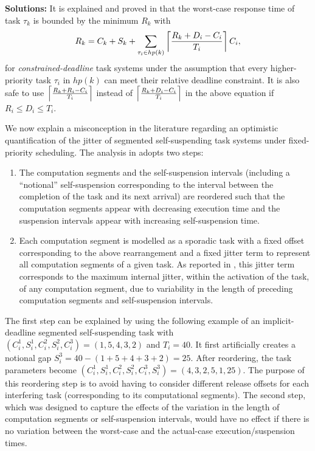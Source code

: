{\bf Solutions:} It is explained and proved in \cite{huangpass:dac2015,BletsasReport2015} that the worst-case response time of task $\tau_k$ is bounded by the minimum $R_k$ with
\begin{equation}
R_k = C_k+ S_k+\sum_{\tau_i \in hp(k)}\left\lceil{\frac{R_k+D_i-C_i}{T_i}}\right\rceil C_i,
\label{eq:dynamic-correct}
\end{equation}
for \emph{constrained-deadline} task systems under the assumption that every higher-priority task $\tau_i$ in $hp(k)$ can meet their relative deadline constraint. It is also safe to use $\left\lceil{\frac{R_k+R_i-C_i}{T_i}}\right\rceil$ instead of $\left\lceil{\frac{R_k+D_i-C_i}{T_i}}\right\rceil$ in the above equation if $R_i \leq D_i \leq T_i$.

\label{sec:wrong-jitter-segmented}


We now explain a misconception in the literature regarding an optimistic quantification of the jitter of segmented self-suspending task systems under fixed-priority scheduling.  The analysis in \cite{RTCSA-BletsasA05} adopts two steps: 
\begin{enumerate}
\item The computation segments and the self-suspension intervals (including a ``notional''
self-suspension corresponding to the interval between the completion of the task and its next arrival)
are reordered such that the computation segments appear with decreasing execution time and
the suspension intervals appear with increasing self-suspension time.
\item Each computation segment is modelled as a sporadic task with a fixed offset corresponding to the above
rearrangement and a fixed jitter term to represent all computation segments of a given task.
As reported in \cite{RTCSA-BletsasA05}, this jitter term corresponds to the maximum internal jitter, within the 
activation of the task, of any computation segment, due to variability in the length of 
preceding computation segments and self-suspension intervals.
\end{enumerate}
The first step can be explained by using the following example of an
implicit-deadline segmented self-suspending task with $(C_i^1, S_i^1, C_i^2, S_i^2, C_i^3) = (1, 5, 4, 3, 2)$ and $T_i=40$.  It first artificially creates a notional gap $S_i^3=40-(1+5+4+3+2)=25$. After reordering, the task parameters become $(C_i^1, S_i^1, C_i^2, S_i^2, C_i^3, S_i^3)  = (4, 3, 2, 5, 1, 25)$.  The purpose of this reordering step is to avoid having to consider different release offsets for each interfering task (corresponding to its computational segments). 
The second step, which was designed to capture the effects of the variation in the length of 
computation segments or self-suspension intervals, would have no effect if 
there is no variation between the worst-case and the actual-case execution/suspension times.



